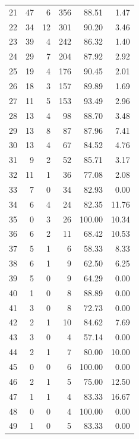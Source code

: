 \documentclass[11pt]{article}
\begin{document}
\begin{longtable}{r|r|r|r|r|r}
    21    & 47    & 6     & 356   & 88.51 & 1.47 \\
    22    & 34    & 12    & 301   & 90.20 & 3.46 \\
    23    & 39    & 4     & 242   & 86.32 & 1.40 \\
    24    & 29    & 7     & 204   & 87.92 & 2.92 \\
    25    & 19    & 4     & 176   & 90.45 & 2.01 \\
    26    & 18    & 3     & 157   & 89.89 & 1.69 \\
    27    & 11    & 5     & 153   & 93.49 & 2.96 \\
    28    & 13    & 4     & 98    & 88.70 & 3.48 \\
    29    & 13    & 8     & 87    & 87.96 & 7.41 \\
    30    & 13    & 4     & 67    & 84.52 & 4.76 \\
    31    & 9     & 2     & 52    & 85.71 & 3.17 \\
    32    & 11    & 1     & 36    & 77.08 & 2.08 \\
    33    & 7     & 0     & 34    & 82.93 & 0.00 \\
    34    & 6     & 4     & 24    & 82.35 & 11.76 \\
    35    & 0     & 3     & 26    & 100.00 & 10.34 \\
    36    & 6     & 2     & 11    & 68.42 & 10.53 \\
    37    & 5     & 1     & 6     & 58.33 & 8.33 \\
    38    & 6     & 1     & 9     & 62.50 & 6.25 \\
    39    & 5     & 0     & 9     & 64.29 & 0.00 \\
    40    & 1     & 0     & 8     & 88.89 & 0.00 \\
    41    & 3     & 0     & 8     & 72.73 & 0.00 \\
    42    & 2     & 1     & 10    & 84.62 & 7.69 \\
    43    & 3     & 0     & 4     & 57.14 & 0.00 \\
    44    & 2     & 1     & 7     & 80.00 & 10.00 \\
    45    & 0     & 0     & 6     & 100.00 & 0.00 \\
    46    & 2     & 1     & 5     & 75.00 & 12.50 \\
    47    & 1     & 1     & 4     & 83.33 & 16.67 \\
    48    & 0     & 0     & 4     & 100.00 & 0.00 \\
    49    & 1     & 0     & 5     & 83.33 & 0.00\\

\end{longtable}
\end{document}
